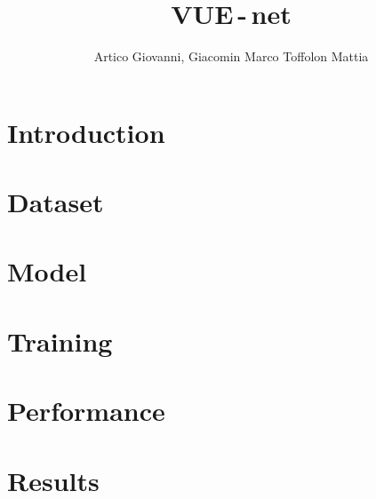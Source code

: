 \documentclass[letterpaper]{article} %
\title{{\myfont VUE\,-\,net}}
\author{
    Artico Giovanni\equalcontrib,
    Giacomin Marco\equalcontrib
    Toffolon Mattia\equalcontrib
}
\begin{document}
\maketitle

% 
% 
% 

\section{Introduction}


\section{Dataset}


\section{Model}


\section{Training}


\section{Performance}


\section{Results}


\nocite{*}
\newpage

\end{document}
